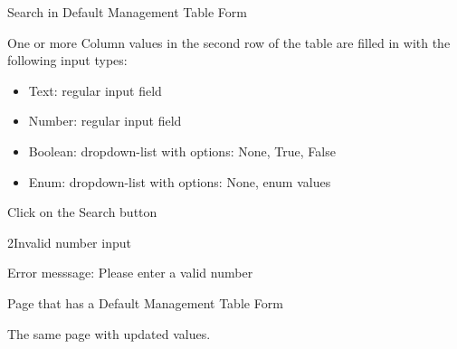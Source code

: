 
\begin{uc}{Search in Default Management Table Form}

    \begin{uc-mss}
    	\item One or more Column values in the second row of the table are filled in with
    	the following input types:
    	\begin{itemize}
			\item Text: regular input field
			\item Number: regular input field
			\item Boolean: dropdown-list with options: None, True, False
			\item Enum: dropdown-list with options: None, {enum values}
		\end{itemize}
    	\item Click on the Search button
    \end{uc-mss}
    
    \begin{uc-ext}

        \begin{uc-fail}{2}{Invalid number input}
        \item Error messsage: Please enter a valid number
        \end{uc-fail}
        

    \end{uc-ext}

    \begin{uc-pre}
    \item Page that has a Default Management Table Form
    \end{uc-pre}

    \begin{uc-post}
    \item The same page with updated values.
    \end{uc-post}

\end{uc}

